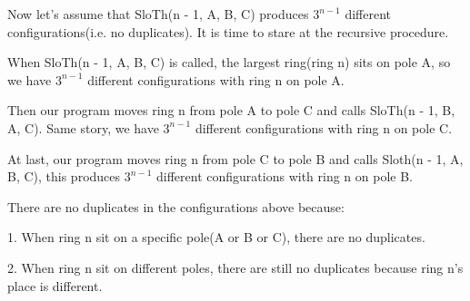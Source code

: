 \documentclass[a4paper,11pt]{article}
\theoremstyle{mytheor}
\begin{document}
Now let's assume that SloTh(n - 1, A, B, C) produces $3^{n-1}$ different configurations(i.e. no duplicates). It is time to stare at the recursive procedure.

When SloTh(n - 1, A, B, C) is called, the largest ring(ring n) sits on pole A, so we have $3^{n-1}$ different configurations with ring n on pole A.

Then our program moves ring n from pole A to pole C and calls SloTh(n - 1, B, A, C). Same story, we have $3^{n-1}$ different configurations with ring n on pole C.

At last, our program moves ring n from pole C to pole B and calls Sloth(n - 1, A, B, C), this produces $3^{n-1}$ different configurations with ring n on pole B.

There are no duplicates in the configurations above because:

1. When ring n sit on a specific pole(A or B or C), there are no duplicates.

2. When ring n sit on different poles, there are still no duplicates because ring n's place is different.
\end{document}
